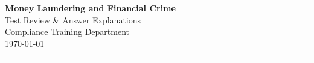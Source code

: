 \documentclass[12pt,aspectratio=169]{beamer}
\begin{document}
	
	\begin{frame}
		\centering
		\vspace{0.5cm}
		{\fontsize{18}{22}\selectfont \textbf{Money Laundering and Financial Crime}}\\[0.2cm]
		{\fontsize{14}{17}\selectfont Test Review \& Answer Explanations}\\[0.4cm]
		{\fontsize{11}{14}\selectfont Compliance Training Department}\\[0.1cm]
		{\fontsize{9}{11}\selectfont \today}
		\vspace{0.3cm}
		\rule{4cm}{1pt}
	\end{frame}
	
\end{document}
